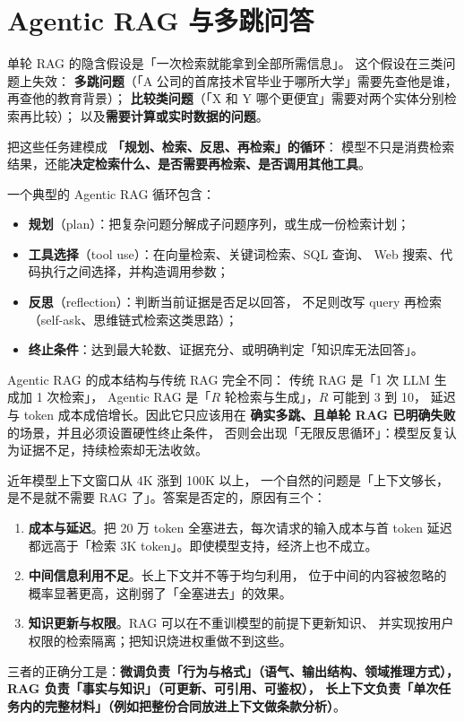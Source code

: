 \section{Agentic RAG 与多跳问答}

单轮 RAG 的隐含假设是「一次检索就能拿到全部所需信息」。
这个假设在三类问题上失效：
\textbf{多跳问题}（「A 公司的首席技术官毕业于哪所大学」需要先查他是谁，再查他的教育背景）；
\textbf{比较类问题}（「X 和 Y 哪个更便宜」需要对两个实体分别检索再比较）；
以及\textbf{需要计算或实时数据的问题}。

 把这些任务建模成
\textbf{「规划、检索、反思、再检索」的循环}：
模型不只是消费检索结果，还能\textbf{决定检索什么、是否需要再检索、是否调用其他工具}。

一个典型的 Agentic RAG 循环包含：
\begin{itemize}
  \item \textbf{规划}（plan）：把复杂问题分解成子问题序列，或生成一份检索计划；
  \item \textbf{工具选择}（tool use）：在向量检索、关键词检索、SQL 查询、
        Web 搜索、代码执行之间选择，并构造调用参数；
  \item \textbf{反思}（reflection）：判断当前证据是否足以回答，
        不足则改写 query 再检索（self-ask、思维链式检索这类思路）；
  \item \textbf{终止条件}：达到最大轮数、证据充分、或明确判定「知识库无法回答」。
\end{itemize}

Agentic RAG 的成本结构与传统 RAG 完全不同：
传统 RAG 是「1 次 LLM 生成加 1 次检索」，
Agentic RAG 是「$R$ 轮检索与生成」，$R$ 可能到 3 到 10，
延迟与 token 成本成倍增长。因此它只应该用在
\textbf{确实多跳、且单轮 RAG 已明确失败}的场景，并且必须设置硬性终止条件，
否则会出现「无限反思循环」：模型反复认为证据不足，持续检索却无法收敛。

\begin{insight}
近年模型上下文窗口从 4K 涨到 100K 以上，
一个自然的问题是「上下文够长，是不是就不需要 RAG 了」。答案是否定的，原因有三个：
\begin{enumerate}
  \item \textbf{成本与延迟}。把 20 万 token 全塞进去，每次请求的输入成本与首 token 延迟
        都远高于「检索 3K token」。即使模型支持，经济上也不成立。
  \item \textbf{中间信息利用不足}。长上下文并不等于均匀利用，
        位于中间的内容被忽略的概率显著更高，这削弱了「全塞进去」的效果。
  \item \textbf{知识更新与权限}。RAG 可以在不重训模型的前提下更新知识、
        并实现按用户权限的检索隔离；把知识烧进权重做不到这些。
\end{enumerate}
三者的正确分工是：\textbf{微调负责「行为与格式」（语气、输出结构、领域推理方式），
RAG 负责「事实与知识」（可更新、可引用、可鉴权），
长上下文负责「单次任务内的完整材料」（例如把整份合同放进上下文做条款分析）}。
\end{insight}

